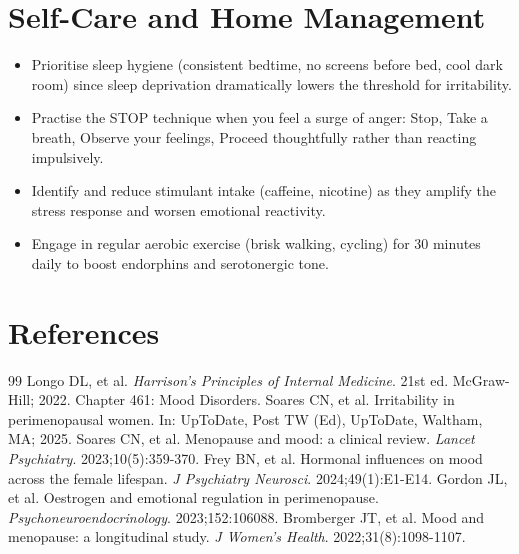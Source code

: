 \section*{Self-Care and Home Management}
\begin{itemize}
  \item Prioritise sleep hygiene (consistent bedtime, no screens before bed, cool dark room) since sleep deprivation dramatically lowers the threshold for irritability.
  \item Practise the STOP technique when you feel a surge of anger: Stop, Take a breath, Observe your feelings, Proceed thoughtfully rather than reacting impulsively.
  \item Identify and reduce stimulant intake (caffeine, nicotine) as they amplify the stress response and worsen emotional reactivity.
  \item Engage in regular aerobic exercise (brisk walking, cycling) for 30 minutes daily to boost endorphins and serotonergic tone.
\end{itemize}

\section*{References}

\begin{thebibliography}{99}
 Longo DL, et al. \emph{Harrison's Principles of Internal Medicine}. 21st ed. McGraw-Hill; 2022. Chapter 461: Mood Disorders.
 Soares CN, et al. Irritability in perimenopausal women. In: UpToDate, Post TW (Ed), UpToDate, Waltham, MA; 2025.
 Soares CN, et al. Menopause and mood: a clinical review. \emph{Lancet Psychiatry}. 2023;10(5):359-370.
 Frey BN, et al. Hormonal influences on mood across the female lifespan. \emph{J Psychiatry Neurosci}. 2024;49(1):E1-E14.
 Gordon JL, et al. Oestrogen and emotional regulation in perimenopause. \emph{Psychoneuroendocrinology}. 2023;152:106088.
 Bromberger JT, et al. Mood and menopause: a longitudinal study. \emph{J Women's Health}. 2022;31(8):1098-1107.
\end{thebibliography}
